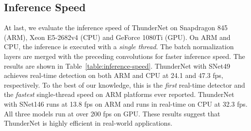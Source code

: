 \subsection{Inference Speed}
\label{section:inference-speed}

At last, we evaluate the inference speed of ThunderNet on Snapdragon 845 (ARM), Xeon E5-2682v4 (CPU) and GeForce 1080Ti (GPU).
On ARM and CPU, the inference is executed with a \emph{single thread}.
The batch normalization layers are merged with the preceding convolutions for faster inference speed.
The results are shown in Table~\ref{table:inference-speed}.
ThunderNet with SNet49 achieves real-time detection on both ARM and CPU at 24.1 and 47.3 fps, respectively.
To the best of our knowledge, this is the \emph{first} real-time detector and the \emph{fastest} single-thread speed on ARM platforms ever reported.
ThunderNet with SNet146 runs at 13.8 fps on ARM and runs in real-time on CPU at 32.3 fps.
All three models run at over 200 fps on GPU.
These results suggest that ThunderNet is highly efficient in real-world applications.

